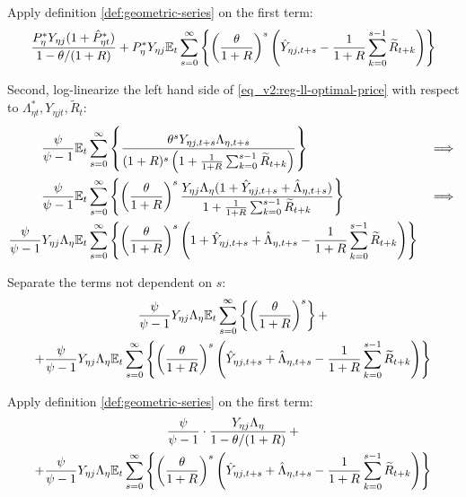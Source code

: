 \documentclass[../thesis.tex]{subfiles}
\begin{document}
Apply definition \ref{def:geometric-series} on the first term:
\begin{align}
	\frac{ P_{\eta}^{\ast} Y_{\eta j} ( 1 + \hat{P}_{\eta t}^{\ast} )}{1-\theta /(1+R)} + P_{\eta}^{\ast} Y_{\eta j} {\mathbb{E}_{t}} \sum_{s=0}^{\infty} \left\{ \left( \frac{\theta}{1 + R} \right)^s \left( \hat{Y}_{\eta j, t+s} - \frac{1}{1 + R} \sum_{k=0}^{s-1} \widetilde{R}_{t+k} \right) \right\} \nonumber
\end{align}

Second, log-linearize the left hand side of \ref{eq_v2:reg-ll-optimal-price} with respect to \( \Lambda_{\eta t}^{\ast}, Y_{\eta j t}, \widetilde{R}_t \):
\begin{alignat}{2}
	\frac{\psi}{\psi-1} &{\mathbb{E}_{t}} \sum_{s=0}^{\infty} \left\{ \frac{\theta^s Y_{\eta j,t+s} \Lambda_{\eta, t+s}}{ (1 + R)^s \left( 1 + \frac{1}{1 + R} \sum_{k=0}^{s-1} \widetilde{R}_{t+k} \right)} \right\} & \implies \nonumber \\
	\frac{\psi}{\psi-1} &{\mathbb{E}_{t}} \sum_{s=0}^{\infty} \left\{ \left( \frac{\theta}{1 + R} \right)^s \frac{ Y_{\eta j} \Lambda_{\eta} (1+ \hat{Y}_{\eta j, t+s} + \hat{\Lambda}_{\eta, t+s})}{ 1 + \frac{1}{1 + R} \sum_{k=0}^{s-1} \widetilde{R}_{t+k}} \right\} & \implies \nonumber \\
	\frac{\psi}{\psi-1} Y_{\eta j} \Lambda_{\eta} &{\mathbb{E}_{t}} \sum_{s=0}^{\infty} \left\{ \left( \frac{\theta}{1 + R} \right)^s \left( 1+ \hat{Y}_{\eta j, t+s} + \hat{\Lambda}_{\eta, t+s} - \frac{1}{1 + R} \sum_{k=0}^{s-1} \widetilde{R}_{t+k} \right) \right\} & \nonumber
\end{alignat}

Separate the terms not dependent on $s$:
\begin{multline}
	\frac{\psi}{\psi-1} Y_{\eta j} \Lambda_{\eta} {\mathbb{E}_{t}} \sum_{s=0}^{\infty} \left\{ \left( \frac{\theta}{1 + R} \right)^s \right\} + 
	\\
	+ \frac{\psi}{\psi-1} Y_{\eta j} \Lambda_{\eta} {\mathbb{E}_{t}} \sum_{s=0}^{\infty} \left\{ \left( \frac{\theta}{1 + R} \right)^s \left( \hat{Y}_{\eta j, t+s} + \hat{\Lambda}_{\eta, t+s} - \frac{1}{1 + R} \sum_{k=0}^{s-1} \widetilde{R}_{t+k} \right) \right\} \nonumber
\end{multline}

Apply definition \ref{def:geometric-series} on the first term:
\begin{multline}
	\frac{\psi}{\psi-1} \cdot \frac{Y_{\eta j} \Lambda_{\eta}}{1-\theta /(1+R)} \, + 
	\\
	+ \frac{\psi}{\psi-1} Y_{\eta j} \Lambda_{\eta} {\mathbb{E}_{t}} \sum_{s=0}^{\infty} \left\{ \left( \frac{\theta}{1 + R} \right)^s \left( \hat{Y}_{\eta j, t+s} + \hat{\Lambda}_{\eta, t+s} - \frac{1}{1 + R} \sum_{k=0}^{s-1} \widetilde{R}_{t+k} \right) \right\} \nonumber
\end{multline}
\end{document}
